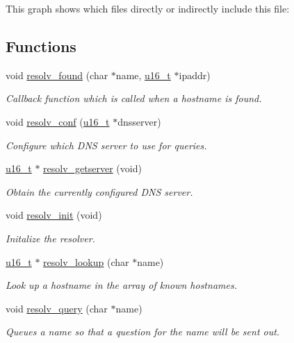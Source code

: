 This graph shows which files directly or indirectly include this file:\subsection*{Functions}
\begin{CompactItemize}
\item 
void \hyperlink{a00083_g6d9751d534453425c7a5a215d1d4414c}{resolv\_\-found} (char $\ast$name, \hyperlink{a00070_gfc6499c1f28697aa3bfc2804d496fd11}{u16\_\-t} $\ast$ipaddr)
\begin{CompactList}\small\item\em Callback function which is called when a hostname is found. \item\end{CompactList}\item 
void \hyperlink{a00083_gdf916e0c752f5cda70d0bddb2be422ba}{resolv\_\-conf} (\hyperlink{a00070_gfc6499c1f28697aa3bfc2804d496fd11}{u16\_\-t} $\ast$dnsserver)
\begin{CompactList}\small\item\em Configure which DNS server to use for queries. \item\end{CompactList}\item 
\hyperlink{a00070_gfc6499c1f28697aa3bfc2804d496fd11}{u16\_\-t} $\ast$ \hyperlink{a00083_g3191066cf8f76bd00b6843b77c37068f}{resolv\_\-getserver} (void)
\begin{CompactList}\small\item\em Obtain the currently configured DNS server. \item\end{CompactList}\item 
\hypertarget{a00083_gb50f78bbf36d912d69f6c1685d0b40e3}{
void \hyperlink{a00083_gb50f78bbf36d912d69f6c1685d0b40e3}{resolv\_\-init} (void)}
\label{a00083_gb50f78bbf36d912d69f6c1685d0b40e3}

\begin{CompactList}\small\item\em Initalize the resolver. \item\end{CompactList}\item 
\hyperlink{a00070_gfc6499c1f28697aa3bfc2804d496fd11}{u16\_\-t} $\ast$ \hyperlink{a00083_g66d19181ad5fe8b8f7c84d1f1d46a2ec}{resolv\_\-lookup} (char $\ast$name)
\begin{CompactList}\small\item\em Look up a hostname in the array of known hostnames. \item\end{CompactList}\item 
void \hyperlink{a00083_ge4dcbbe6c641d2e3b8537b479df5fc99}{resolv\_\-query} (char $\ast$name)
\begin{CompactList}\small\item\em Queues a name so that a question for the name will be sent out. \item\end{CompactList}\end{CompactItemize}
